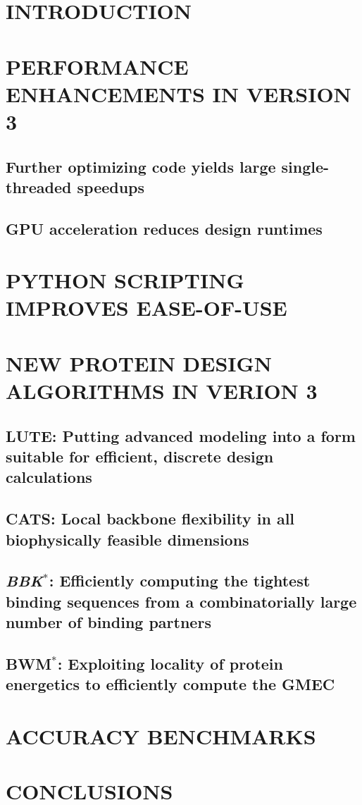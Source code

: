 \documentclass[12pt]{article}
\def\bwmstar{BWM$^*$}
\def\bbks{\textit{BBK$^*$}\xspace}
\newcommand{\jccsubsection}[1]{\subsection*{\sffamily \large #1}}
\begin{document}
  \makeatletter
  \renewcommand\@biblabel[1]{#1.}
  \makeatother



\renewcommand{\baselinestretch}{1.5}
\normalsize


\clearpage


\section*{\sffamily \Large INTRODUCTION} 


\section*{\sffamily \Large PERFORMANCE ENHANCEMENTS IN VERSION 3}
\jccsubsection{Further optimizing code yields large single-threaded speedups}

\jccsubsection{GPU acceleration reduces design runtimes}


\section*{\sffamily \Large PYTHON SCRIPTING IMPROVES EASE-OF-USE}



\section*{\sffamily \Large NEW PROTEIN DESIGN ALGORITHMS IN VERION 3}
\jccsubsection{LUTE: Putting advanced modeling into a form suitable for efficient, discrete design calculations}

\jccsubsection{CATS: Local backbone flexibility in all biophysically feasible dimensions}

\jccsubsection{\bbks: Efficiently computing the tightest binding sequences from a combinatorially large number of binding partners}

\jccsubsection{\bwmstar: Exploiting locality of protein energetics to efficiently compute the GMEC}


\section*{\sffamily \Large ACCURACY BENCHMARKS}


\section*{\sffamily \Large CONCLUSIONS}

\end{document}
